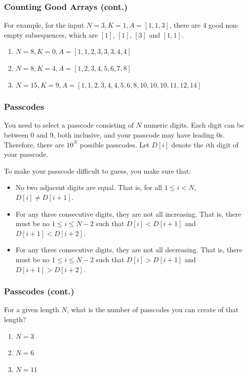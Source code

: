 \documentclass{beamer}
\begin{document}
\begin{frame}
\frametitle{Counting Good Arrays (cont.)}
For example, for the input $N = 3, K = 1, A = [1, 1, 3]$, there are 4 good non-empty subsequences, which are $[1]$, $[1]$, $[3]$ and $[1, 1]$.

\begin{enumerate}
\item[(a)] $N = 8, K = 0, A = [1, 1, 2, 3, 3, 3, 4, 4]$
\item[(b)] $N = 8, K = 4, A = [1, 2, 3, 4, 5, 6, 7, 8]$
\item[(c)] $N = 15, K = 9, A = [1, 1, 2, 3, 4, 4, 5, 6, 8, 10, 10, 10, 11, 12, 14]$
\end{enumerate}
\end{frame}

\begin{frame}
\end{frame}

\begin{frame}[fragile]
\frametitle{Passcodes}

You need to select a passcode consisting of $N$ numeric digits. Each digit can be between 0 and 9, both inclusive, and your passcode may have leading 0s. Therefore, there are $10^N$ possible passcodes. Let $D[i]$ denote the $i$th digit of your passcode.

To make your passcode difficult to guess, you make sure that:
\begin{itemize}
\item No two adjacent digits are equal. That is, for all $1 \leq i < N$, $D[i] \neq D[i + 1]$.
\item For any three consecutive digits, they are not all increasing. That is, there must be no $1 \leq i \leq N - 2$ such that $D[i] < D[i + 1]$ and $D[i + 1] < D[i + 2]$.
\item For any three consecutive digits, they are not all decreasing. That is, there must be no $1 \leq i \leq N - 2$ such that $D[i] > D[i + 1]$ and $D[i + 1] > D[i + 2]$.
\end{itemize}

\end{frame}

\begin{frame}
\frametitle{Passcodes (cont.)}
For a given length $N$, what is the number of passcodes you can create of that length?

\begin{enumerate}
\item[(a)] $N = 3$
\item[(b)] $N = 6$
\item[(c)] $N = 11$
\end{enumerate}
\end{frame}
\end{document}
